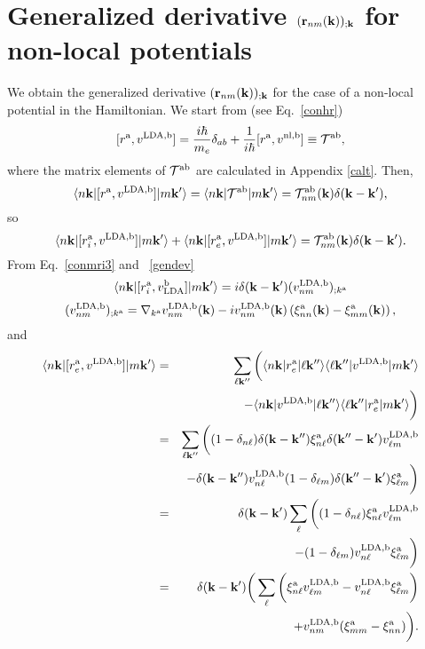 \section{Generalized derivative $(\mathbf{r}_{nm}(\mathbf{k}))_{;\mathbf{k}}$ for
  non-local potentials}\label{gdernl}

We obtain the generalized derivative $(\mathbf{r}_{nm}(\mathbf{k}))_{;\mathbf{k}}$ for
the case of a non-local potential in the Hamiltonian.
We start from (see Eq.~\eqref{conhr})
\begin{equation}\label{na_hrdab}
[r^{\mathrm{a}},v^{\mathrm{LDA},\mathrm{b}}]= 
\frac{i\hbar}{m_e}\delta_{ab}+
\frac{1}{i\hbar}[r^{\mathrm{a}},v^{\mathrm{nl},\mathrm{b}}]
\equiv
{\cal T}^{\mathrm{a}\mathrm{b}}
,
\end{equation} 
where the matrix elements of ${\cal T}^{\mathrm{a}\mathrm{b}}$ are calculated in
Appendix \ref{calt}.
Then,
\begin{equation}\label{na_hrdab2}
\langle n\mathbf{k} |[r^{\mathrm{a}},v^{\mathrm{LDA},\mathrm{b}}]| m\mathbf{k}' \rangle
=
\langle n\mathbf{k} |{\cal T}^{\mathrm{a}\mathrm{b}}| m\mathbf{k}' \rangle
=
{\cal T}^{\mathrm{a}\mathrm{b}}_{nm}(\mathbf{k})\delta(\mathbf{k}-\mathbf{k}')
,
\end{equation}
so
\begin{equation}\label{na_hrdab3}
\langle n\mathbf{k} |[r^{\mathrm{a}}_i,v^{\mathrm{LDA},\mathrm{b}}]| m\mathbf{k}' \rangle
+
\langle n\mathbf{k} |[r^{\mathrm{a}}_e,v^{\mathrm{LDA},\mathrm{b}}]| m\mathbf{k}' \rangle
=
{\cal T}^{\mathrm{a}\mathrm{b}}_{nm}(\mathbf{k})\delta(\mathbf{k}-\mathbf{k}')
.
\end{equation}
From Eq.~\eqref{conmri3} and ~\eqref{gendev}
\begin{equation}\label{na_rip}
\langle n\mathbf{k} |[r^{\mathrm{a}}_i,v_{\mathrm{LDA}}^{\mathrm{b}}]| m\mathbf{k}' \rangle
=i\delta(\mathbf{k}-\mathbf{k}')(v_{nm}^{\mathrm{LDA},\mathrm{b}})_{;k^{\mathrm{a}}}
\end{equation}
\begin{equation}\label{na_ripn}
(v^{\mathrm{LDA},\mathrm{b}}_{nm})_{;k^{\mathrm{a}}}=
\nabla_{k^{\mathrm{a}}}
v^{\mathrm{LDA},\mathrm{b}}_{n m}(\mathbf{k})
-
i
v^{\mathrm{LDA},\mathrm{b}}_{nm}(\mathbf{k})
\left(
\xi^{\mathrm{a}}_{nn}(\mathbf{k})
-
\xi^{\mathrm{a}}_{mm}(\mathbf{k})
\right)
,
\end{equation}
and
\begin{eqnarray}\label{na_rep}
\langle n\mathbf{k} |[r^{\mathrm{a}}_e,v^{\mathrm{LDA},\mathrm{b}}]| m\mathbf{k}' \rangle&=&
\sum_{\ell\mathbf{k}''}
\bigg(
\langle n\mathbf{k} |r^{\mathrm{a}}_e| \ell\mathbf{k}'' \rangle\langle \ell\mathbf{k}'' |v^{\mathrm{LDA},\mathrm{b}}| m\mathbf{k}' \rangle
\nonumber \\
&&
-
\langle n\mathbf{k} |v^{\mathrm{LDA},\mathrm{b}}| \ell\mathbf{k}'' \rangle\langle \ell\mathbf{k}'' |r^{\mathrm{a}}_e| m\mathbf{k}' \rangle
\bigg)
\nonumber \\
&=&
\sum_{\ell\mathbf{k}''}
\bigg(
(1-\delta_{n\ell})\delta(\mathbf{k}-\mathbf{k}'')\xi^{\mathrm{a}}_{n\ell}
\delta(\mathbf{k}''-\mathbf{k}')v^{\mathrm{LDA},\mathrm{b}}_{\ell m}
\nonumber \\
&&-
\delta(\mathbf{k}-\mathbf{k}'')v^{\mathrm{LDA},\mathrm{b}}_{n\ell}
(1-\delta_{\ell m})\delta(\mathbf{k}''-\mathbf{k}')\xi^{\mathrm{a}}_{\ell m}
\bigg)
\nonumber \\
&=&
\delta(\mathbf{k}-\mathbf{k}')
\sum_{\ell}
\bigg(
(1-\delta_{n\ell})
\xi^{\mathrm{a}}_{n\ell}
v^{\mathrm{LDA},\mathrm{b}}_{\ell m}
\nonumber \\
&&-
(1-\delta_{\ell m})
v^{\mathrm{LDA},\mathrm{b}}_{n\ell}
\xi^{\mathrm{a}}_{\ell m}
\bigg)
\nonumber \\
&=&
\delta(\mathbf{k}-\mathbf{k}')
\bigg(
\sum_{\ell}
\bigg(
\xi^{\mathrm{a}}_{n\ell}
v^{\mathrm{LDA},\mathrm{b}}_{\ell m}
-
v^{\mathrm{LDA},\mathrm{b}}_{n\ell}
\xi^{\mathrm{a}}_{\ell m}
\bigg)
\nonumber \\
&&+
v^{\mathrm{LDA},\mathrm{b}}_{nm}(\xi^{\mathrm{a}}_{mm}
-
\xi^{\mathrm{a}}_{nn}
)
\bigg)
.
\end{eqnarray}

